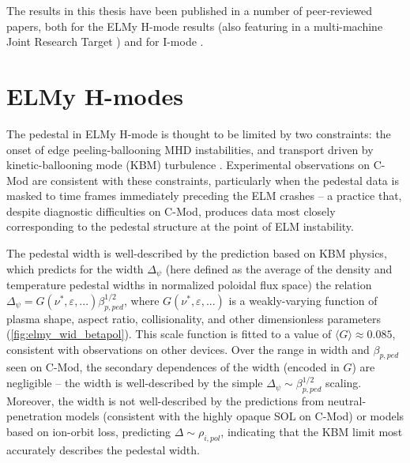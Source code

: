 \documentclass[ twoside,openright,titlepage,numbers=noenddot,headinclude,%
                footinclude=true,cleardoublepage=empty,abstractoff, %
                BCOR=5mm,paper=letter,fontsize=11pt,%
                ngerman,american,%
                ]{scrreprt}
\begin{document}
\noindent The results in this thesis have been published in a number of peer-reviewed papers, both for the ELMy H-mode results \cite{Walk2012} (also featuring in a multi-machine Joint Research Target \cite{Groebner2013}) and for I-mode \cite{Walk2014}.

\section*{ELMy H-modes}

The pedestal in ELMy H-mode is thought to be limited by two constraints: the onset of edge peeling-ballooning MHD instabilities, and transport driven by kinetic-ballooning mode (KBM) turbulence \cite{Snyder2011}.  Experimental observations on C-Mod are consistent with these constraints, particularly when the pedestal data is masked to time frames immediately preceding the ELM crashes -- a practice that, despite diagnostic difficulties on C-Mod, produces data most closely corresponding to the pedestal structure at the point of ELM instability.

The pedestal width is well-described by the prediction based on KBM physics, which predicts for the width $\Delta_\psi$ (here defined as the average of the density and temperature pedestal widths in normalized poloidal flux space) the relation $\Delta_\psi = G(\nu^*,\varepsilon,...) \beta_{p,ped}^{1/2}$, where $G(\nu^*,\varepsilon,...)$ is a weakly-varying function of plasma shape, aspect ratio, collisionality, and other dimensionless parameters (\cref{fig:elmy_wid_betapol}).  This scale function is fitted to a value of $\langle G \rangle \approx 0.085$, consistent with observations on other devices.  Over the range in width and $\beta_{p,ped}$ seen on C-Mod, the secondary dependences of the width (encoded in $G$) are negligible -- the width is well-described by the simple $\Delta_\psi \sim \beta_{p,ped}^{1/2}$ scaling. Moreover, the width is not well-described by the predictions from neutral-penetration models (consistent with the highly opaque SOL on C-Mod) or models based on ion-orbit loss, predicting $\Delta \sim \rho_{i,pol}$, indicating that the KBM limit most accurately describes the pedestal width.
\end{document}
